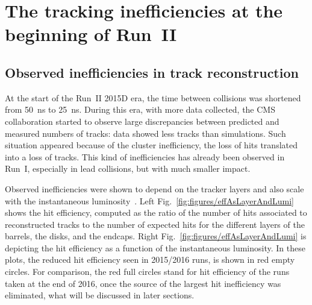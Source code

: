 
\clearpage

\setcounter{secnumdepth}{4}
\setcounter{secnumdepth}{4}


\section{The tracking inefficiencies at the beginning of Run~II}

\subsection{Observed inefficiencies in track reconstruction}

At the start of the Run~II 2015D era, the time between collisions was shortened from 50~ns to 25~ns. During this era, with more data collected, the CMS collaboration started to observe large discrepancies between predicted and measured numbers of tracks: data showed less tracks than simulations. Such situation appeared because of the cluster inefficiency, the loss of hits translated into a loss of tracks. This kind of inefficiencies has already been observed in Run~I, especially in lead collisions, but with much smaller impact. 

Observed inefficiencies were shown to depend on the tracker layers and also scale with the instantaneous luminosity~\cite{website:hitEff}. Left Fig.~\ref{fig:figures/effAsLayerAndLumi} shows the hit efficiency, computed as the ratio of the number of hits associated to reconstructed tracks to the number of expected hits for the different layers of the barrels, the disks, and the endcaps. Right Fig.~\ref{fig:figures/effAsLayerAndLumi} is depicting the hit efficiency  as a function of the instantaneous luminosity. In these plots, the reduced hit efficiency seen in 2015/2016 runs, is shown in red empty circles. For comparison, the red full circles stand for hit efficiency of the runs taken at the end of 2016, once the source of the largest hit inefficiency was eliminated, what will be discussed in later sections.



